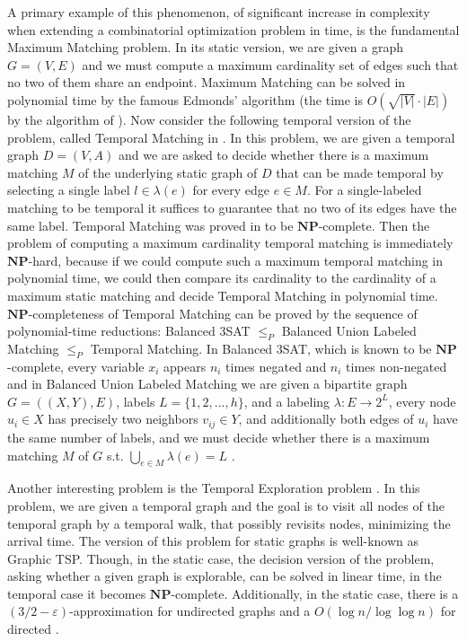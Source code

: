 \documentclass[oribibl, 11pt]{llncs}
\newcommand{\rem}{\mathbf}
\begin{document}
A primary example of this phenomenon, of significant increase in complexity when extending a combinatorial optimization problem in time, is the fundamental {\sc Maximum Matching} problem. In its static version, we are given a graph $G=(V,E)$ and we must compute a maximum cardinality set of edges such that no two of them share an endpoint. {\sc Maximum Matching} can be solved in polynomial time by the famous Edmonds' algorithm \cite{Ed65} (the time is $O(\sqrt{|V|}\cdot |E|)$ by the algorithm of \cite{MV80}). Now consider the following temporal version of the problem, called {\sc Temporal Matching} in \cite{MS14}. In this problem, we are given a temporal graph $D=(V,A)$ and we are asked to decide whether there is a maximum matching $M$ of the underlying static graph of $D$ that can be made temporal by selecting a single label $l\in\lambda(e)$ for every edge $e\in M$. For a single-labeled matching to be temporal it suffices to guarantee that no two of its edges have the same label. {\sc Temporal Matching} was proved in \cite{MS14} to be $\rem{NP}$-complete. Then the problem of computing a maximum cardinality temporal matching is immediately $\rem{NP}$-hard, because if we could compute such a maximum temporal matching in polynomial time, we could then compare its cardinality to the cardinality of a maximum static matching and decide {\sc Temporal Matching} in polynomial time. $\rem{NP}$-completeness of {\sc Temporal Matching} can be proved by the sequence of polynomial-time reductions: {\sc Balanced 3SAT} $\leq_P$ {\sc Balanced Union Labeled Matching} $\leq_P$ {\sc Temporal Matching}. In {\sc Balanced 3SAT}, which is known to be $\rem{NP}$-complete, every variable $x_i$ appears $n_i$ times negated and $n_i$ times non-negated and in {\sc Balanced Union Labeled Matching} we are given a bipartite graph $G=((X,Y),E)$, labels $L=\{1,2,...,h\}$, and a labeling $\lambda : E \rightarrow 2^L$, every node $u_i\in X$ has precisely two neighbors $v_{ij}\in Y$, and additionally both edges of $u_i$ have the same number of labels, and we must decide whether there is a maximum matching $M$ of $G$ s.t. $\bigcup_{e\in M} \lambda(e) = L$ \cite{MS14}.

Another interesting problem is the {\sc Temporal Exploration} problem \cite{MS14}. In this problem, we are given a temporal graph and the goal is to visit all nodes of the temporal graph by a temporal walk, that possibly revisits nodes, minimizing the arrival time. The version of this problem for static graphs is well-known as {\sc Graphic TSP}. Though, in the static case, the decision version of the problem, asking whether a given graph is explorable, can be solved in linear time, in the temporal case it becomes $\rem{NP}$-complete. Additionally, in the static case, there is a $(3/2-\varepsilon)$-approximation for undirected graphs \cite{GSS11} and a $O(\log n/\log\log n)$ for directed \cite{AGMGS10}. 
\end{document}
